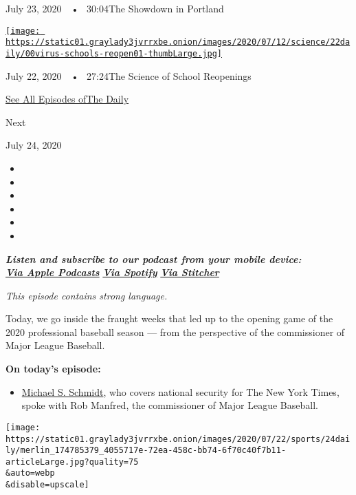 July 23, 2020~~•~ 30:04The Showdown in Portland

\href{https://www.nytimes3xbfgragh.onion/2020/07/22/podcasts/the-daily/school-reopenings-coronavirus.html?action=click\&module=audio-series-bar\&region=header\&pgtype=Article}{\texttt{[image: https://static01.graylady3jvrrxbe.onion/images/2020/07/12/science/22daily/00virus-schools-reopen01-thumbLarge.jpg]}}

July 22, 2020~~•~ 27:24The Science of School Reopenings

\href{https://www.nytimes3xbfgragh.onion/column/the-daily}{See All
Episodes ofThe Daily}

Next

July 24, 2020

\begin{itemize}
\item
\item
\item
\item
\item
\item
\end{itemize}

\emph{\textbf{Listen and subscribe to our podcast from your mobile
device:}}\\
\textbf{\href{https://itunes.apple.com/us/podcast/the-daily/id1200361736?mt=2}{\emph{Via
Apple Podcasts}}} \emph{\textbf{\textbar{}}}
\textbf{\href{https://open.spotify.com/show/3IM0lmZxpFAY7CwMuv9H4g?si=SfuMSC55R1qprFsRZU3_zw}{\emph{Via
Spotify}}} \emph{\textbf{\textbar{}}}
\textbf{\href{http://www.stitcher.com/podcast/the-new-york-times/the-daily-10}{\emph{Via
Stitcher}}}

\emph{This episode contains strong language.}

Today, we go inside the fraught weeks that led up to the opening game of
the 2020 professional baseball season --- from the perspective of the
commissioner of Major League Baseball.

\textbf{On today's episode:}

\begin{itemize}
\tightlist
\item
  \href{https://www.nytimes3xbfgragh.onion/by/michael-s-schmidt?smid=pc-thedaily}{Michael
  S. Schmidt}, who covers national security for The New York Times,
  spoke with Rob Manfred, the commissioner of Major League Baseball.
\end{itemize}

\texttt{[image: https://static01.graylady3jvrrxbe.onion/images/2020/07/22/sports/24daily/merlin\_174785379\_4055717e-72ea-458c-bb74-6f70c40f7b11-articleLarge.jpg?quality=75\\\&auto=webp\\\&disable=upscale]}


